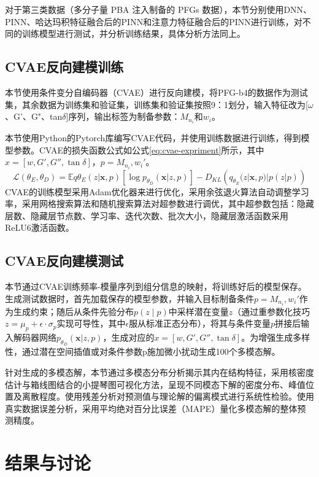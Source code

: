 对于第三类数据（多分子量 PBA 注入制备的 PFGs 数据），本节分别使用DNN、PINN、哈达玛积特征融合后的PINN和注意力特征融合后的PINN进行训练，对不同的训练模型进行测试，并分析训练结果，具体分析方法同上。

\subsection{CVAE反向建模训练}
本节使用条件变分自编码器（CVAE）进行反向建模，将PFG-b4的数据作为测试集，其余数据为训练集和验证集，训练集和验证集按照9：1划分，输入特征改为[$\omega$、G'、G"、tan$\delta$]序列，输出标签为制备参数：$M_{n_i}$和$w_i$。

本节使用Python的Pytorch库编写CVAE代码，并使用训练数据进行训练，得到模型参数。CVAE的损失函数公式如公式\eqref{eq:cvae-expriment}所示，其中$x = [w, G', G'', \tan \delta]$，$p = { M_{n_i}, w_i }'$。
\begin{equation}
  \mathcal{L}(\theta_E, \theta_D) = \mathbb{E}{q{\theta_E}(z|\mathbf{x},p)} \left[ \log p_{\theta_D}(\mathbf{x}|z,p) \right] - D_{KL}\left(q_{\theta_E}(z|\mathbf{x},p) | p(z|p)\right) \label{eq:cvae-expriment}
\end{equation}
CVAE的训练模型采用Adam优化器来进行优化，采用余弦退火算法自动调整学习率，采用网格搜索算法和随机搜索算法对超参数进行调优，其中超参数包括：隐藏层数、隐藏层节点数、学习率、迭代次数、批次大小，隐藏层激活函数采用ReLU6激活函数。
\subsection{CVAE反向建模测试}
本节通过CVAE训练频率-模量序列到组分信息的映射，将训练好后的模型保存。生成测试数据时，首先加载保存的模型参数，并输入目标制备条件$p = { M_{n_i}, w_i }'$作为生成约束；随后从条件先验分布$p(z∣p)$中采样潜在变量$z$（通过重参数化技巧$z=\mu_p+\epsilon⋅\sigma_p$实现可导性，其中$\epsilon$服从标准正态分布），将其与条件变量$p$拼接后输入解码器网络$p_{\theta_D}(\mathbf{x}|z,p)$，生成对应的$x = [w, G', G'', \tan \delta]$。为增强生成多样性，通过潜在空间插值或对条件参数p施加微小扰动生成100个多模态解。

针对生成的多模态解，本节通过多模态分布分析揭示其内在结构特征，采用核密度估计与箱线图结合的小提琴图可视化方法，呈现不同模态下解的密度分布、峰值位置及离散程度。使用残差分析对预测值与理论解的偏离模式进行系统性检验。使用真实数据误差分析，采用平均绝对百分比误差（MAPE）量化多模态解的整体预测精度。
\section{结果与讨论}
